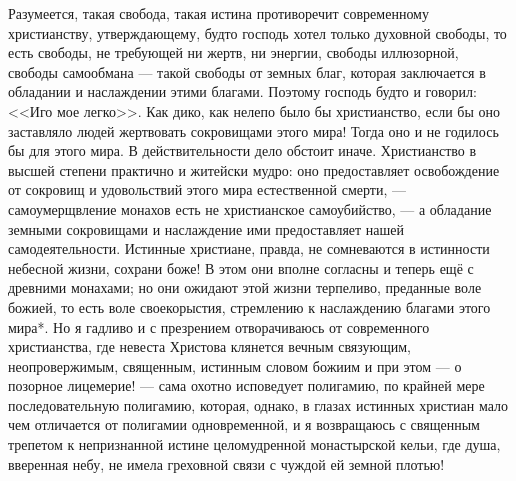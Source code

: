 \documentclass[12pt,oneside]{book}
\begin{document}
Разумеется, такая свобода, такая истина противоречит современному христианству, утверждающему, будто господь хотел только духовной свободы, то есть свободы, не требующей ни жертв, ни энергии, свободы иллюзорной, свободы самообмана --- такой свободы от земных благ, которая заключается в обладании и наслаждении этими благами. Поэтому господь будто и говорил: <<Иго мое легко>>. Как дико, как нелепо было бы христианство, если бы оно заставляло людей жертвовать сокровищами этого мира! Тогда оно и не годилось бы для этого мира. В действительности дело обстоит иначе. Христианство в высшей степени практично и житейски мудро: оно предоставляет освобождение от сокровищ и удовольствий этого мира естественной смерти, --- самоумерщвление монахов есть не христианское самоубийство, --- а обладание земными сокровищами и наслаждение ими предоставляет нашей самодеятельности. Истинные христиане, правда, не сомневаются в истинности небесной жизни, сохрани боже! В этом они вполне согласны и теперь ещё с древними монахами; но они ожидают этой жизни терпеливо, преданные воле божией, то есть воле своекорыстия, стремлению к наслаждению благами этого мира*\let\svthefootnote\thefootnote\let\thefootnote\relax{}\let\thefootnote\svthefootnote. Но я гадливо и с презрением отворачиваюсь от современного христианства, где невеста Христова клянется вечным связующим, неопровержимым, священным, истинным словом божиим и при этом --- о позорное лицемерие! --- сама охотно исповедует полигамию, по крайней мере последовательную полигамию, которая, однако, в глазах истинных христиан мало чем отличается от полигамии одновременной, и я возвращаюсь с священным трепетом к непризнанной истине целомудренной монастырской кельи, где душа, вверенная небу, не имела греховной связи с чуждой ей земной плотью!
\end{document}
